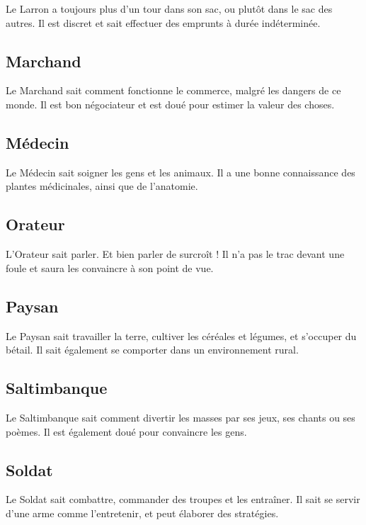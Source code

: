 \documentclass[twoside,12pt,english]{book}
\begin{document}
Le Larron a toujours plus d'un tour dans son sac, ou plutôt dans le sac des autres. Il est discret et sait effectuer des emprunts à durée indéterminée.

\subsection*{Marchand}

Le Marchand sait comment fonctionne le commerce, malgré les dangers de ce monde. Il est bon négociateur et est doué pour estimer la valeur des choses.

\subsection*{Médecin}

Le Médecin sait soigner les gens et les animaux. Il a une bonne connaissance des plantes médicinales, ainsi que de l'anatomie.

\subsection*{Orateur}

L'Orateur sait parler. Et bien parler de surcroît ! Il n'a pas le trac devant une foule et saura les convaincre à son point de vue.

\subsection*{Paysan}

Le Paysan sait travailler la terre, cultiver les céréales et légumes, et s'occuper du bétail. Il sait également se comporter dans un environnement rural.

\subsection*{Saltimbanque}

Le Saltimbanque sait comment divertir les masses par ses jeux, ses chants ou ses poèmes. Il est également doué pour convaincre les gens.

\subsection*{Soldat}

Le Soldat sait combattre, commander des troupes et les entraîner. Il sait se servir d'une arme comme l'entretenir, et peut élaborer des stratégies.
\end{document}
